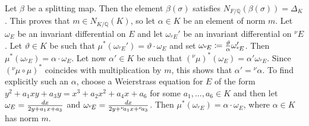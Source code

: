 \documentclass[11pt]{amsart}
\theoremstyle{definition}
\begin{document}
		Let $\beta$ be a splitting map. Then the element $\beta(\sigma)$ satisfies $N_{F/{\mathbb{Q}}}(\beta(\sigma))=\Delta_K$. This proves that $m\in N_{K/{\mathbb{Q}}}(K)$, so let $\alpha\in K$ be an element of norm $m$. Let $\omega_E$ be an invariant differential on $E$ and let $\omega_{{{}^\nu\!} E}'$ be an invariant differential on ${{}^\nu\!} E$. Let $\vartheta\in K$ be such that $\mu^*(\omega_{{{}^\nu\!} E}')=\vartheta\cdot\omega_E$ and set ${\displaystyle} \omega_{{{}^\nu\!} E}\coloneqq \frac{\vartheta}{\alpha}\omega_{{{}^\nu\!} E}'$. Then $\mu^*(\omega_{{{}^\nu\!} E})=\alpha\cdot\omega_E$. Let now $\alpha'\in K$ be such that $({{}^\nu\!}\mu)^*(\omega_E)=\alpha'\omega_{{{}^\nu\!} E}$. Since $({{}^\nu\!}\mu\circ \mu)^*$ coincides with multiplication by $m$, this shows that $\alpha'={{}^\nu\!}\alpha$. To find explicitly such an $\alpha$, choose a Weierstrass equation for $E$ of the form $y^2+a_1xy+a_3y=x^3+a_2x^2+a_4x+a_6$ for some $a_1,\ldots,a_6\in K$ and then let ${\displaystyle} \omega_E=\frac{dx}{2y+a_1x+a_3}$ and ${\displaystyle} \omega_{{{}^\nu\!} E}=\frac{dx}{2y+{{}^\nu\!} a_1x+{{}^\nu\!} a_3}$. Then $\mu^*(\omega_{{{}^\nu\!} E})=\alpha\cdot\omega_E$, where $\alpha\in K$ has norm $m$.
\end{document}
